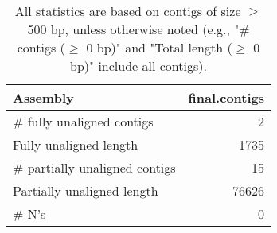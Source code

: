 \documentclass[12pt,a4paper]{article}
\begin{document}
\begin{table}[ht]
\begin{center}
\caption{All statistics are based on contigs of size $\geq$ 500 bp, unless otherwise noted (e.g., "\# contigs ($\geq$ 0 bp)" and "Total length ($\geq$ 0 bp)" include all contigs).}
\begin{tabular}{|l*{1}{|r}|}
\hline
Assembly & final.contigs \\ \hline
\# fully unaligned contigs & 2 \\ \hline
Fully unaligned length & 1735 \\ \hline
\# partially unaligned contigs & 15 \\ \hline
Partially unaligned length & 76626 \\ \hline
\# N's & 0 \\ \hline
\end{tabular}
\end{center}
\end{table}
\end{document}

